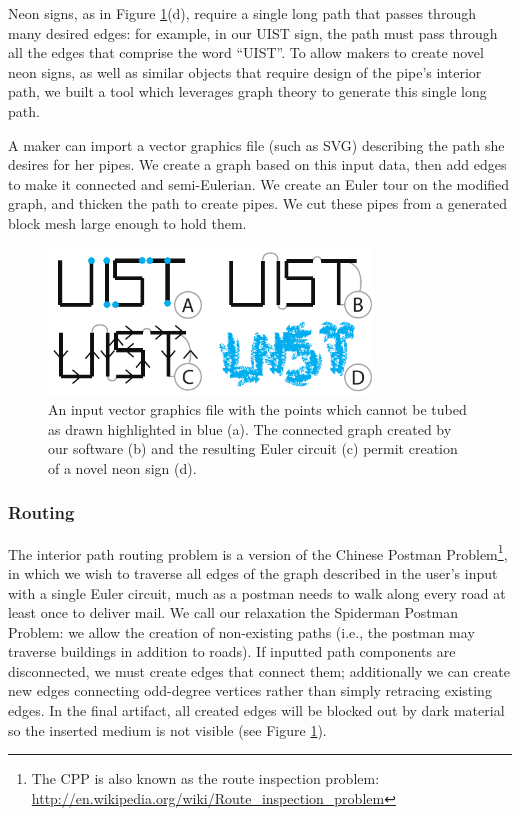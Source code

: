 Neon signs, as in Figure \ref{fig:tool-process-interior}(d), require a single long path that passes through many desired edges: for example, in our UIST sign, the path must pass through all the edges that comprise the word ``UIST''.  To allow makers to create novel neon signs, as well as similar objects that require design of the pipe's interior path, we built a tool which leverages graph theory to generate this single long path.

A maker can import a vector graphics file (such as SVG) describing the path she desires for her pipes.  We create a graph based on this input data, then add edges to make it connected and semi-Eulerian.  We create an Euler tour on the modified graph, and thicken the path to create pipes.    We cut these pipes from a generated block mesh large enough to hold them.

\begin{figure}[h!]
\centering
    \includegraphics[width=3.4in]{figures/interior.pdf}
\caption{An input vector graphics file with the points which cannot be tubed as drawn highlighted in {\color{blue}blue} (a).  The connected graph created by our software (b) and the resulting Euler circuit (c) permit creation of a novel neon sign (d).}
\label{fig:tool-process-interior}
\end{figure}

\subsubsection{Routing}
The interior path routing problem is a version of the Chinese Postman Problem\footnote{The CPP is also known as the route inspection problem: \url{http://en.wikipedia.org/wiki/Route_inspection_problem}}, in which we wish to traverse all edges of the graph described in the user's input with a single Euler circuit, much as a postman needs to walk along every road at least once to deliver mail.  We call our relaxation the Spiderman Postman Problem: we allow the creation of non-existing paths (i.e., the postman may traverse buildings in addition to roads).  If inputted path components are disconnected, we must create edges that connect them; additionally we can create new edges connecting odd-degree vertices rather than simply retracing existing edges.  In the final artifact, all created edges will be blocked out by dark material so the inserted medium is not visible (see Figure \ref{fig:tool-process-interior}).

